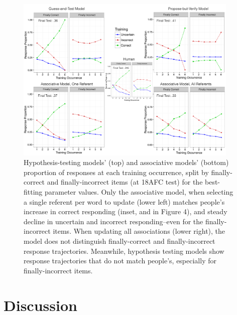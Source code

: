 \documentclass[man,floatsintext]{apa6}
\begin{document}
\begin{figure}[h]
  \centering
  \includegraphics[width=0.95\textwidth]{response_graph_loglik_w_human}
  \caption{Hypothesis-testing models' (top) and associative models' (bottom) proportion of responses at each training occurrence, split by finally-correct and finally-incorrect items (at 18AFC test) for the best-fitting parameter values. Only the associative model, when selecting a single referent per word to update (lower left) matches people's increase in correct responding (inset, and in Figure 4), and steady decline in uncertain and incorrect responding--even for the finally-incorrect items. When updating all associations (lower right), the model does not distinguish finally-correct and finally-incorrect response trajectories. Meanwhile, hypothesis testing models show response trajectories that do not match people's, especially for finally-incorrect items.}
  \label{fig:human_vs_models}
\end{figure} 


\section{Discussion}
\end{document}
